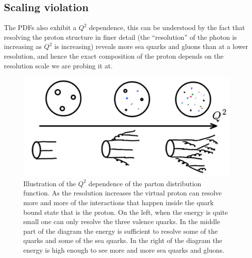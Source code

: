\documentclass[12pt]{article}
\begin{document}

%
\subsection{Scaling violation}
%
The PDFs also exhibit a $Q^2$ dependence, this can be understood by the fact that resolving the proton structure in finer detail (the ``resolution'' of the photon is increasing as $Q^2$ is increasing) reveals more sea quarks and gluons than at a lower resolution, and hence the exact composition of the proton depends on the resolution scale we are probing it at. 
\begin{figure}
\begin{center}
\includegraphics[scale=0.3]{images/Q2depPDF.png}
\end{center}
\caption{Illustration of the $Q^2$ dependence of the parton distribution function. As the resolution increases the virtual proton can resolve more and more of the interactions that happen inside the quark bound state that is the proton. On the left, when the energy is quite small one can only resolve the three valence quarks. In the middle part of the diagram the energy is sufficient to resolve some of the quarks and some of the sea quarks. In the right of the diagram the energy is high enough to see more and more sea quarks and gluons.}\label{fig:Q2depPDF}
\end{figure}

\clearpage
\end{document}
